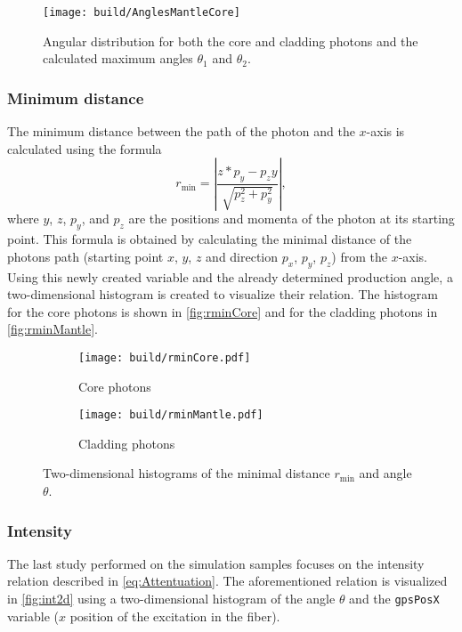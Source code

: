 \begin{figure}[H]
	\centering
	\texttt{[image: build/AnglesMantleCore]}
	\caption{Angular distribution for both the core and cladding photons and the calculated maximum angles $\theta_1$ and $\theta_2$.}
	\label{fig:anglesmantlecore}
\end{figure}


\subsubsection{Minimum distance}

The minimum distance between the path of the photon and the $x$-axis is calculated using the formula 
\begin{equation*}
	r_\mathrm{min} = \left|\frac{z*p_y - p_zy}{\sqrt{p_z^2 + p_y^2}}\right|,
\end{equation*}
where $y$, $z$, $p_y$, and $p_z$ are the positions and momenta of the photon at its starting point. 
This formula is obtained by calculating the minimal distance of the photons path (starting point $x$, $y$, $z$ and direction $p_x$, $p_y$, $p_z$) from the $x$-axis. 
Using this newly created variable and the already determined production angle, a two-dimensional histogram is created to visualize their relation. 
The histogram for the core photons is shown in \autoref{fig:rminCore} and for the cladding photons in \autoref{fig:rminMantle}.

\begin{figure}[H]
	\centering
	\begin{subfigure}{0.45\textwidth}
		\texttt{[image: build/rminCore.pdf]}
		\caption{Core photons}
		\label{fig:rminCore}
	\end{subfigure}
	\begin{subfigure}{0.45\textwidth}
		\texttt{[image: build/rminMantle.pdf]}
		\caption{Cladding photons}
		\label{fig:rminMantle}
	\end{subfigure} 
	\caption{Two-dimensional histograms of the minimal distance $r_\mathrm{min}$ and angle $\theta$.}
	\label{fig:rmin}
\end{figure}


\subsubsection{Intensity}

The last study performed on the simulation samples focuses on the intensity relation described in \eqref{eq:Attentuation}. 
The aforementioned relation is visualized in \autoref{fig:int2d} using a two-dimensional histogram of the angle 
$\theta$ and the \texttt{gpsPosX} variable ($x$ position of the excitation in the fiber). 


